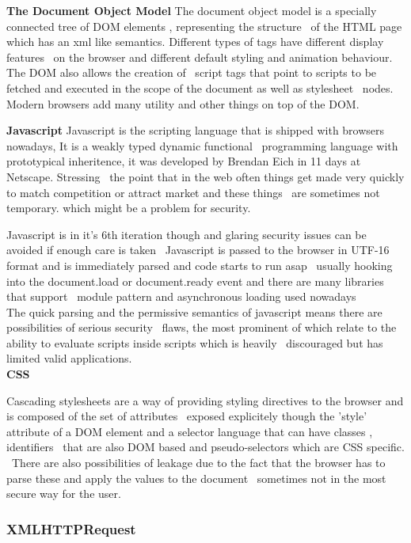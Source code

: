 \documentclass[a4paper,12pt]{paper}
\begin{document}
\textbf{The Document Object Model}
The document object model is a specially connected tree of DOM elements , representing the structure \
of the HTML page which has an xml like semantics. Different types of tags have different display features \
on the browser and different default styling and animation behaviour. The DOM also allows the creation of \
script tags that point to scripts to be fetched and executed in the scope of the document as well as stylesheet \
nodes. Modern browsers add many utility and other things on top of the DOM.

\textbf{Javascript}
Javascript is the scripting language that is shipped with browsers nowadays, It is a weakly typed dynamic functional \
programming language with prototypical inheritence, it was developed by Brendan Eich in 11 days at Netscape. Stressing \
the point that in the web often things get made very quickly to match competition or attract market and these things \
are sometimes not temporary. which might be a problem for security.

Javascript is in it's 6th iteration though and glaring security issues can be avoided if enough care is taken \
Javascript is passed to the browser in UTF-16 format and is immediately parsed and code starts to run asap \ 
usually hooking into the document.load or document.ready event and there are many libraries that support \
module pattern and asynchronous loading used nowadays\\

The quick parsing and the permissive semantics of javascript means there are possibilities of serious security \
flaws, the most prominent of which relate to the ability to evaluate scripts inside scripts which is heavily \
discouraged but has limited valid applications.\\

\textbf{CSS}

Cascading stylesheets are a way of providing styling directives to the browser and is composed of the set of attributes \
exposed explicitely though the 'style' attribute of a DOM element and a selector language that can have classes , identifiers \
that are also DOM based and pseudo-selectors which are CSS specific. \
There are also possibilities of leakage due to the fact that the browser has to parse these and apply the values to the document \
sometimes not in the most secure way for the user.\\

\subsubsection{XMLHTTPRequest}
\end{document}
